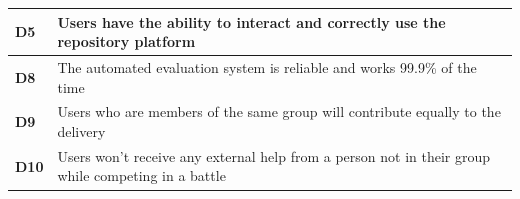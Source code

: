 \documentclass[../RASD.tex]{subfiles}
\begin{document}
\begin{table}[ht]
\begin{center}
\begin{tabular}{|m{2em}|m{30em}|}
                \hline
                \cellcolor{ReqMappingCell3}
                \textbf{D5} & Users have the ability to interact and correctly use the repository platform\\
                \hline
                \cellcolor{ReqMappingCell3}
                \textbf{D8} & The automated evaluation system is reliable and works 99.9\% of the time\\
                \hline
                \cellcolor{ReqMappingCell3}
                \textbf{D9} & Users who are members of the same group will contribute equally to the delivery\\
                \hline
                \cellcolor{ReqMappingCell3}
                \textbf{D10} & Users won't receive any external help from a person not in their group while competing in a battle\\
                \hline
                \end{tabular}
            \end{center}
        \end{table}\newpage
\end{document}

